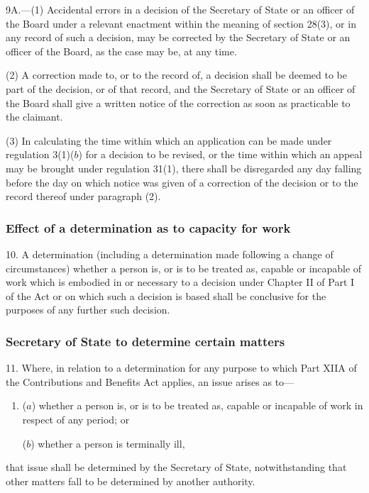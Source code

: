 \documentclass[12pt,a4paper]{article}
\begin{document}
9A.---(1)  Accidental errors in a decision of the Secretary of State or an officer of the Board under a relevant enactment within the meaning of section 28(3), or in any record of such a decision, may be corrected by the Secretary of State or an officer of the Board, as the case may be, at any time.

(2) A correction made to, or to the record of, a decision shall be deemed to be part of the decision, or of that record, and the Secretary of State or an officer of the Board shall give a written notice of the correction as soon as practicable to the claimant.

(3) In calculating the time within which an application can be made under regulation 3(1)($b$)  for a decision to be revised, or the time within which an appeal may be brought under regulation 31(1), there shall be disregarded any day falling before the day on which notice was given of a correction of the decision or to the record thereof under paragraph (2).


\subsubsection[10. Effect of a determination as to capacity for work]{Effect of a determination as to capacity for work}

10.  A determination (including a determination made following a change of circumstances) whether a person is, or is to be treated as, capable or incapable of work which is embodied in or necessary to a decision under Chapter II of Part I of the Act or on which such a decision is based shall be conclusive for the purposes of any further such decision.

\subsubsection[11. Secretary of State to determine certain matters]{Secretary of State to determine certain matters}

11.  Where, in relation to a determination for any purpose to which Part XIIA of the Contributions and Benefits Act applies, an issue arises as to—
\begin{enumerate}\item[]
($a$) whether a person is, or is to be treated as, capable or incapable of work in respect of any period; or

($b$) whether a person is terminally ill,
\end{enumerate}
that issue shall be determined by the Secretary of State, notwithstanding that other matters fall to be determined by another authority.
\end{document}
